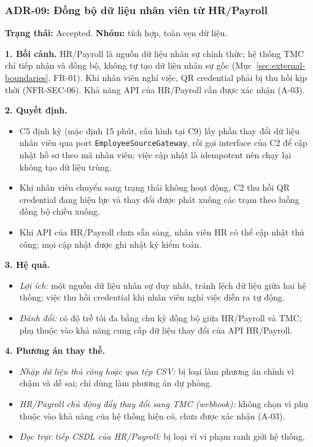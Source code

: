 \subsubsection{ADR-09: Đồng bộ dữ liệu nhân viên từ HR/Payroll}\label{adr:09}
\textbf{Trạng thái:} Accepted. \textbf{Nhóm:} tích hợp, toàn vẹn dữ liệu.

\noindent\textbf{1. Bối cảnh.} HR/Payroll là nguồn dữ liệu nhân sự chính thức; hệ thống TMC chỉ tiếp nhận và đồng bộ, không tự tạo dữ liệu nhân sự gốc (Mục~\ref{sec:external-boundaries}, FR-01). Khi nhân viên nghỉ việc, QR credential phải bị thu hồi kịp thời (NFR-SEC-06). Khả năng API của HR/Payroll cần được xác nhận (A-03).

\noindent\textbf{2. Quyết định.}
\begin{itemize}
    \item C5 định kỳ (mặc định 15 phút, cấu hình tại C9) lấy phần thay đổi dữ liệu nhân viên qua port \texttt{Employee\-Source\-Gateway}, rồi gọi interface của C2 để cập nhật hồ sơ theo mã nhân viên; việc cập nhật là idempotent nên chạy lại không tạo dữ liệu trùng.
    \item Khi nhân viên chuyển sang trạng thái không hoạt động, C2 thu hồi QR credential đang hiệu lực và thay đổi được phát xuống các trạm theo luồng đồng bộ chiều xuống.
    \item Khi API của HR/Payroll chưa sẵn sàng, nhân viên HR có thể cập nhật thủ công; mọi cập nhật được ghi nhật ký kiểm toán.
\end{itemize}

\noindent\textbf{3. Hệ quả.}
\begin{itemize}
    \item \textit{Lợi ích:} một nguồn dữ liệu nhân sự duy nhất, tránh lệch dữ liệu giữa hai hệ thống; việc thu hồi credential khi nhân viên nghỉ việc diễn ra tự động.
    \item \textit{Đánh đổi:} có độ trễ tối đa bằng chu kỳ đồng bộ giữa HR/Payroll và TMC; phụ thuộc vào khả năng cung cấp dữ liệu thay đổi của API HR/Payroll.
\end{itemize}

\noindent\textbf{4. Phương án thay thế.}
\begin{itemize}
    \item \textit{Nhập dữ liệu thủ công hoặc qua tệp CSV:} bị loại làm phương án chính vì chậm và dễ sai; chỉ dùng làm phương án dự phòng.
    \item \textit{HR/Payroll chủ động đẩy thay đổi sang TMC (webhook):} không chọn vì phụ thuộc vào khả năng của hệ thống hiện có, chưa được xác nhận (A-03).
    \item \textit{Đọc trực tiếp CSDL của HR/Payroll:} bị loại vì vi phạm ranh giới hệ thống.
\end{itemize}

